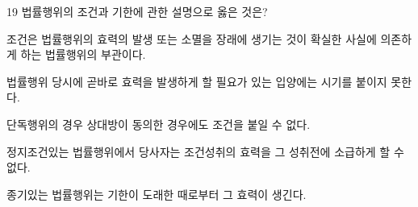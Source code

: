 \begin{question}{19}
법률행위의 조건과 기한에 관한 설명으로 옳은 것은?
\begin{choices}
  \item 조건은 법률행위의 효력의 발생 또는 소멸을 장래에 생기는 것이 확실한 사실에 의존하게 하는 법률행위의 부관이다.
  \item 법률행위 당시에 곧바로 효력을 발생하게 할 필요가 있는 입양에는 시기를 붙이지 못한다.
  \item 단독행위의 경우 상대방이 동의한 경우에도 조건을 붙일 수 없다.
  \item 정지조건있는 법률행위에서 당사자는 조건성취의 효력을 그 성취전에 소급하게 할 수 없다.
  \item 종기있는 법률행위는 기한이 도래한 때로부터 그 효력이 생긴다.
\end{choices}
\end{question}
